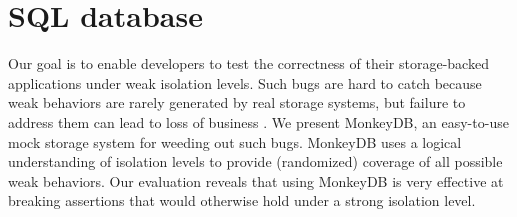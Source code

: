 
\section{SQL database}
\label{sec:conc}

Our goal is to enable developers to test the correctness of their storage-backed applications under 
weak isolation levels. Such bugs are hard to catch because weak behaviors are
rarely generated by real storage systems, but failure to address them can lead
to loss of business \cite{acidrain}. We present MonkeyDB, an easy-to-use mock storage system
for weeding out such bugs. MonkeyDB uses a logical understanding of isolation
levels to provide (randomized) coverage of all possible weak behaviors. Our evaluation reveals that
using MonkeyDB is very effective at breaking assertions that would otherwise
hold under a strong isolation level.

